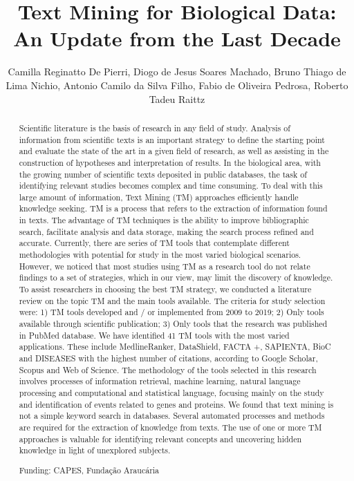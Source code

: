 \documentclass[twoside]{article}
\title{\vspace{-15mm}\fontsize{24pt}{10pt}\selectfont\textbf{ Text Mining for Biological Data: An Update from the Last Decade }} %
\author{ Camilla Reginatto De Pierri, Diogo de Jesus Soares Machado, Bruno Thiago de Lima Nichio, Antonio Camilo da Silva Filho, Fabio de Oliveira Pedrosa, Roberto Tadeu Raittz }
\affil{ Federal University of Paran\'a }
\date{}
\begin{document}
  
  
  \maketitle %
  
  
  \thispagestyle{fancy} %
  
  
  \begin{abstract}
  Scientific literature is the basis of research in any field of study. Analysis of information from scientific texts is an important strategy to define the starting point and evaluate the state of the art in a given field of research,  as well as assisting in the construction of hypotheses and interpretation of results. In the biological area,  with the growing number of scientific texts deposited in public databases,  the task of identifying relevant studies becomes complex and time consuming. To deal with this large amount of information,  Text Mining (TM) approaches efficiently handle knowledge seeking. TM is a process that refers to the extraction of information found in texts. The advantage of TM techniques is the ability to improve bibliographic search,  facilitate analysis and data storage,  making the search process refined and accurate. Currently,  there are series of TM tools that contemplate different methodologies with potential for study in the most varied biological scenarios. However,  we noticed that most studies using TM as a research tool do not relate findings to a set of strategies,  which in our view,  may limit the discovery of knowledge. To assist researchers in choosing the best TM strategy,  we conducted a literature review on the topic TM and the main tools available. The criteria for study selection were: 1) TM tools developed and / or implemented from 2009 to 2019; 2) Only tools available through scientific publication; 3) Only tools that the research was published in PubMed database. We have identified 41 TM tools with the most varied applications. These include MedlineRanker,  DataShield,  FACTA +,  SAPIENTA,  BioC and DISEASES with the highest number of citations,  according to Google Scholar,  Scopus and Web of Science. The methodology of the tools selected in this research involves processes of information retrieval,  machine learning,  natural language processing and computational and statistical language,  focusing mainly on the study and identification of events related to genes and proteins. We found that text mining is not a simple keyword search in databases. Several automated processes and methods are required for the extraction of knowledge from texts. The use of one or more TM approaches is valuable for identifying relevant concepts and uncovering hidden knowledge in light of unexplored subjects.
  
  Funding: CAPES,  Funda\c{c}\~ao Arauc\'aria \\ 
  \end{abstract}
  
\end{document}
